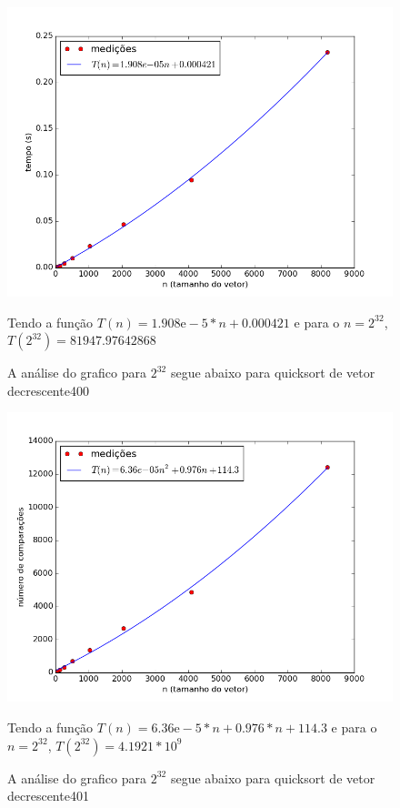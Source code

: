 \documentclass[12pt,a4paper,twoside]{report}
\begin{document}


\begin{figure}[ht]
\centering \includegraphics[scale=0.8]{../quicksort/imagens/quicksortQuaseDecresc400.png}
\caption{A análise do grafico para $2^{32}$ segue abaixo para quicksort de vetor decrescente400}

Tendo a função $T(n) = 1.908\mathrm{e}-5*n+0.000421$ e para o $n =2^{32}$, $T(2^{32}) = 81947.97642868$ 

\label{fig:quicksortQuaseDecresc400}
\end{figure}

\begin{figure}[ht]
\centering \includegraphics[scale=0.8]{../quicksort/imagens/quicksortQuaseDecresc401.png}
\caption{A análise do grafico para $2^{32}$ segue abaixo para quicksort de vetor decrescente401}

Tendo a função $T(n) = 6.36\mathrm{e}-5*n+0.976*n+114.3$ e para o $n =2^{32}$, $T(2^{32}) = 4.1921*10^9$

\label{fig:quicksortQuaseDecresc401}
\end{figure}
\end{document}
